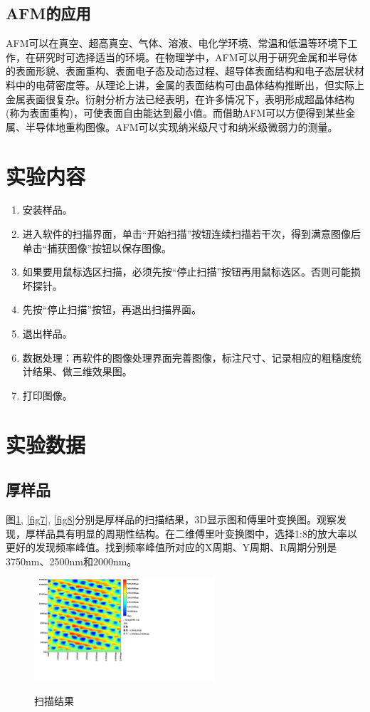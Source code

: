 \documentclass[a4paper]{article}
\begin{document}
\subsection{AFM的应用}
AFM可以在真空、超高真空、气体、溶液、电化学环境、常温和低温等环境下工作，在研究时可选择适当的环境。在物理学中，AFM可以用于研究金属和半导体的表面形貌、表面重构、表面电子态及动态过程、超导体表面结构和电子态层状材料中的电荷密度等。从理论上讲，金属的表面结构可由晶体结构推断出，但实际上金属表面很复杂。衍射分析方法已经表明，在许多情况下，表明形成超晶体结构(称为表面重构)，可使表面自由能达到最小值。而借助AFM可以方便得到某些金属、半导体地重构图像。AFM可以实现纳米级尺寸和纳米级微弱力的测量。

\section{实验内容}
\begin{enumerate}
\item 安装样品。
\item 进入软件的扫描界面，单击“开始扫描”按钮连续扫描若干次，得到满意图像后单击“捕获图像”按钮以保存图像。
\item 如果要用鼠标选区扫描，必须先按“停止扫描”按钮再用鼠标选区。否则可能损坏探针。
\item 先按“停止扫描”按钮，再退出扫描界面。
\item 退出样品。
\item 数据处理：再软件的图像处理界面完善图像，标注尺寸、记录相应的粗糙度统计结果、做三维效果图。
\item 打印图像。
\end{enumerate}

\section{实验数据}
\subsection{厚样品}
图\ref{fig6}, \ref{fig7}, \ref{fig8}分别是厚样品的扫描结果，3D显示图和傅里叶变换图。观察发现，厚样品具有明显的周期性结构。在二维傅里叶变换图中，选择1:8的放大率以更好的发现频率峰值。找到频率峰值所对应的X周期、Y周期、R周期分别是3750nm、2500nm和2000nm。
\begin{figure}[htbp]
\centering
\includegraphics[width=0.6\textwidth]{data/0/hengxl000C.png}\\
\caption{扫描结果}\label{fig6}
\end{figure}
\end{document}
